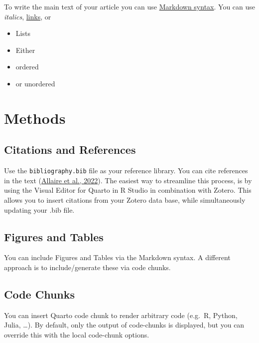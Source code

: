 \documentclass[
]{article}
\providecommand{\tightlist}{%
  \setlength{\itemsep}{0pt}\setlength{\parskip}{0pt}}\usepackage{longtable,booktabs,array}
\begin{document}
To write the main text of your article you can use
\href{https://www.markdownguide.org/basic-syntax/}{Markdown syntax}. You
can use \emph{italics},
\href{https://www.urbandictionary.com/define.php?term=Link}{links}, or

\begin{itemize}
\tightlist
\item
  Lists
\item
  Either
\item
  ordered
\item
  or unordered
\end{itemize}

\hypertarget{methods}{%
\section{Methods}\label{methods}}

\hypertarget{citations-and-references}{%
\subsection{Citations and References}\label{citations-and-references}}

Use the \texttt{bibliography.bib} file as your reference library. You
can cite references in the text
(\protect\hyperlink{ref-allaire2022}{Allaire et al., 2022}). The easiest
way to streamline this process, is by using the Visual Editor for Quarto
in R Studio in combination with Zotero. This allows you to insert
citations from your Zotero data base, while simultaneously updating your
.bib file.

\hypertarget{figures-and-tables}{%
\subsection{Figures and Tables}\label{figures-and-tables}}

You can include Figures and Tables via the Markdown syntax. A different
approach is to include/generate these via code chunks.

\hypertarget{code-chunks}{%
\subsection{Code Chunks}\label{code-chunks}}

You can insert Quarto code chunk to render arbitrary code (e.g.~R,
Python, Julia, \ldots). By default, only the output of code-chunks is
displayed, but you can override this with the local code-chunk options.
\end{document}
